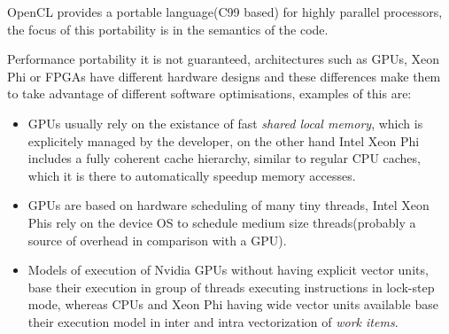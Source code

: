 \par{OpenCL provides a portable language(C99 based) for highly parallel processors, the focus of this portability is in the 
    semantics of the code.}

\par{Performance portability it is not guaranteed, architectures such as GPUs, Xeon Phi or FPGAs have different
    hardware designs and these differences make them to take advantage of different software optimisations\cite{opencl_phi},
    examples of this are:}

\begin{itemize}
    \item GPUs usually rely on the existance of fast \emph{shared local memory}, which is explicitely managed by the developer, on
        the other hand Intel Xeon Phi includes a fully coherent cache hierarchy, similar to regular CPU caches, which it is there
        to automatically speedup memory accesses\cite{opencl_phi}.

    \item GPUs are based on hardware scheduling of many tiny threads, Intel Xeon Phis rely on the device OS to schedule medium size
        threads(probably a source of overhead in comparison with a GPU)\cite{opencl_phi}.

    \item Models of execution of Nvidia GPUs without having explicit vector units, base their execution in group of threads 
    executing instructions in lock-step mode, whereas CPUs and Xeon Phi having wide vector units available base their execution 
    model in inter and intra vectorization of \emph{work items}\cite{vector}.
\end{itemize}


